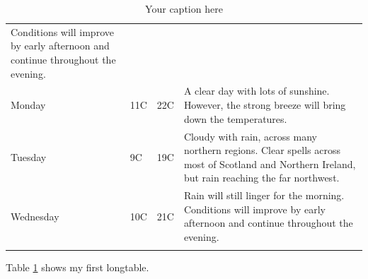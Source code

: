 \documentclass{article}
\begin{document}
\begin{center}
\begin{longtable}{ | l | l | l | p{} |}
	    Conditions will improve by early afternoon and continue 
	    throughout the evening. \\
	    Monday & 11C & 22C & A clear day with lots of sunshine.  
	    However, the strong breeze will bring down the temperatures. \\ \hline
	    Tuesday & 9C & 19C & Cloudy with rain, across many northern regions. Clear spells 
	    across most of Scotland and Northern Ireland, 
	    but rain reaching the far northwest. \\ \hline
	    Wednesday & 10C & 21C & Rain will still linger for the morning. 
	    Conditions will improve by early afternoon and continue 
	    throughout the evening. \\
	    \hline
		\caption{Your caption here} %
		\label{tab:myfirstlongtable}
	    \end{longtable}
	\end{center}

Table \ref{tab:myfirstlongtable} shows my first longtable.
\end{document}
